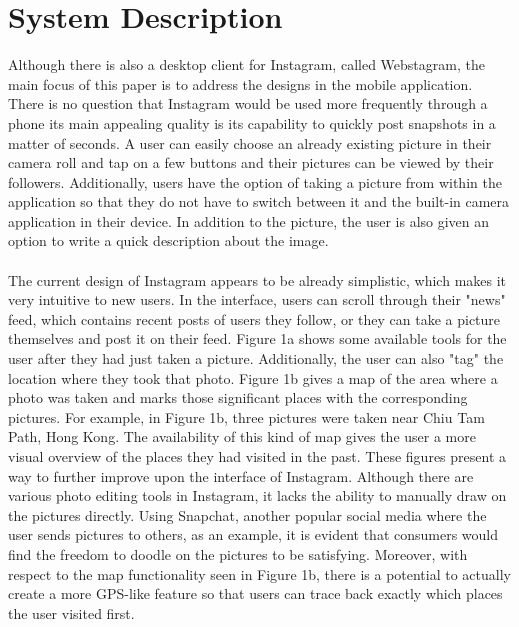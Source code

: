 \documentclass[11pt]{article}
\begin{document}
     
\section{System Description}
\label{System Description}
   \indent 
   \indent Although there is also a desktop client for Instagram, called Webstagram, the main focus of this paper is to address the designs in the mobile application. There is no question that Instagram would be used more frequently through a phone its main appealing quality is its capability to quickly post snapshots in a matter of seconds. A user can easily choose an already existing picture in their camera roll and tap on a few buttons and their pictures can be viewed by their followers. Additionally, users have the option of taking a picture from within the application so that they do not have to switch between it and the built-in camera application in their device. In addition to the picture, the user is also given an option to write a quick description about the image. \\ \\
   \indent The current design of Instagram appears to be already simplistic, which makes it very intuitive to new users. In the interface, users can scroll through their "news" feed, which contains recent posts of users they follow, or they can take a picture themselves and post it on their feed. Figure 1a shows some available tools for the user after they had just taken a picture. Additionally, the user can also "tag" the location where they took that photo. Figure 1b gives a map of the area where a photo was taken and marks those significant places with the corresponding pictures. For example, in Figure 1b, three pictures were taken near Chiu Tam Path, Hong Kong. The availability of this kind of map gives the user a more visual overview of the places they had visited in the past. 
   \indent These figures present a way to further improve upon the interface of Instagram. Although there are various photo editing tools in Instagram, it lacks the ability to manually draw on the pictures directly. Using Snapchat, another popular social media where the user sends pictures to others, as an example, it is evident that consumers would find the freedom to doodle on the pictures to be satisfying. Moreover, with respect to the map functionality seen in Figure 1b, there is a potential to actually create a more GPS-like feature so that users can trace back exactly which places the user visited first.
      
\end{document}
